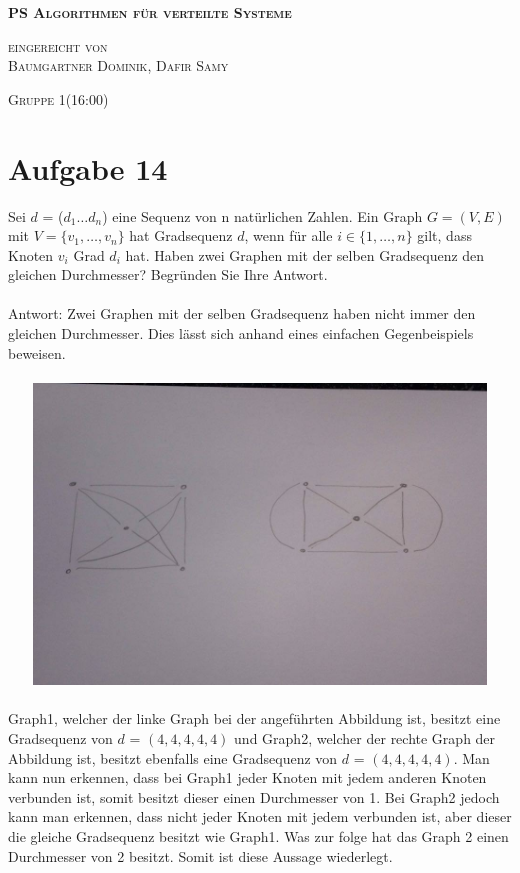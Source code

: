 \documentclass[12pt,a4paper]{report}
\begin{document}
\begin{titlepage}
	\begin{center}

		\vspace*{1.0cm}
		\huge
		\textsc{\bf{PS Algorithmen für verteilte Systeme}}

		\vspace*{4.0cm}
		\textsc{
			\normalsize{eingereicht von} \\[0.5\baselineskip]
			{\large Baumgartner Dominik, Dafir Samy}
		}

		\vspace*{3.0cm}
		\textsc{
			\normalsize{Gruppe  1(16:00)}
		}

	\end{center}
\end{titlepage}

\section*{Aufgabe 14}
Sei $d$ = ($d_1\dots d_n$) eine Sequenz von n natürlichen Zahlen. Ein Graph $G = (V, E)$ mit $V = \{v_1,\dots, v_n\}$ hat Gradsequenz $d$, wenn für alle $i \in \{1,\dots, n\}$ gilt, dass Knoten $v_i$ Grad $d_i$ hat. Haben zwei Graphen mit der selben Gradsequenz den gleichen Durchmesser? Begründen Sie Ihre Antwort.
\\
\\
Antwort: Zwei Graphen mit der selben Gradsequenz haben nicht immer den gleichen Durchmesser. Dies lässt sich anhand eines einfachen Gegenbeispiels beweisen.\\
\\
\includegraphics[height=8cm, width=15cm]{gegenbsp.jpg}
\\
\\
Graph1, welcher der linke Graph bei der angeführten Abbildung ist, besitzt eine Gradsequenz von $d$ = $(4,4,4,4,4)$ und Graph2, welcher der rechte Graph der Abbildung ist, besitzt ebenfalls eine Gradsequenz von $d$ = $(4,4,4,4,4)$. Man kann nun erkennen, dass bei Graph1 jeder Knoten mit jedem anderen Knoten verbunden ist, somit besitzt dieser einen Durchmesser von 1. Bei Graph2 jedoch kann man erkennen, dass nicht jeder Knoten mit jedem verbunden ist, aber dieser die gleiche Gradsequenz besitzt wie Graph1. Was zur folge hat das Graph 2 einen Durchmesser von 2 besitzt. Somit ist diese Aussage wiederlegt.
\end{document}
